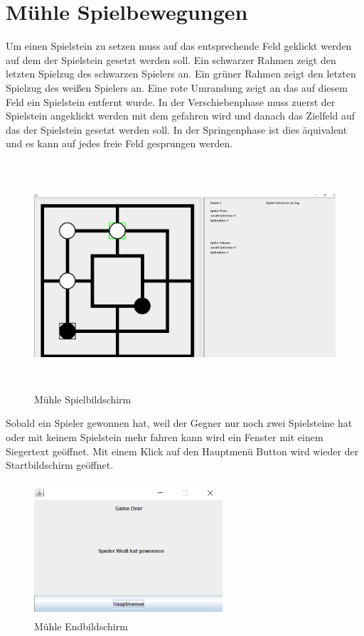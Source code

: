 \documentclass[oneside]{ausarbeitung}
\begin{document}
\section{Mühle Spielbewegungen}

Um einen Spielstein zu setzen muss auf das entsprechende Feld geklickt werden auf dem der Spielstein gesetzt werden soll. Ein schwarzer Rahmen zeigt den letzten Spielzug des schwarzen Spielers an. Ein grüner Rahmen zeigt den letzten Spielzug des weißen Spielers an. Eine rote Umrandung zeigt an das auf diesem Feld ein Spielstein entfernt wurde. In der Verschiebenphase muss zuerst der Spielstein angeklickt werden mit dem gefahren wird und danach das Zielfeld auf das der Spielstein gesetzt werden soll. In der Springenphase ist dies äquivalent und es kann auf jedes freie Feld gesprungen werden.

\begin{figure}[ht]
	\centering
	\includegraphics[width=16.0cm,height=8.5cm]{images/MuehleSpiel.png}
	\caption[Mühle Spielbildschirm]{Mühle Spielbildschirm}
\end{figure}

Sobald ein Spieler gewonnen hat, weil der Gegner nur noch zwei Spielsteine hat oder mit keinem Spielstein mehr fahren kann wird ein Fenster mit einem Siegertext geöffnet. Mit einem Klick auf den Hauptmenü Button wird wieder der Startbildschirm geöffnet.

\begin{figure}[ht]
	\centering
	\includegraphics[width=7cm,height=5cm]{images/Endbildschirm.png}
	\caption[Mühle Endbildschirm]{Mühle Endbildschirm}
\end{figure}
\end{document}
